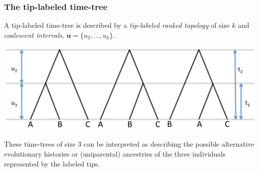 \begin{frame}
\frametitle{The tip-labeled time-tree}

A tip-labeled time-tree is described by a {\it tip-labeled ranked topology} of size $k$ and {\it coalescent intervals}, $\mathbf{u} = \{u_2, \dots, u_k\}$.

\medskip{}

\begin{centering}

\includegraphics[width=\textwidth]{../images/timetree3}

\end{centering}

\medskip{}

These time-trees of size 3 can be interpreted as describing the possible alternative evolutionary histories or (uniparental) ancestries of the three individuals represented by the labeled tips.


\end{frame}
